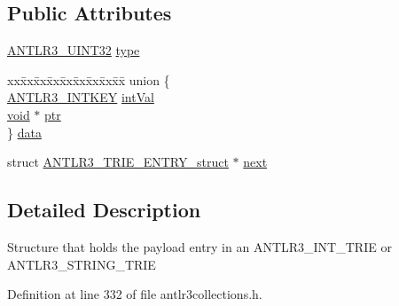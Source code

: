 \subsection*{Public Attributes}
\begin{DoxyCompactItemize}
\item 
\hyperlink{antlr3defs_8h_ac41f744abd0fd25144b9eb9d11b1dfd1}{A\-N\-T\-L\-R3\-\_\-\-U\-I\-N\-T32} \hyperlink{struct_a_n_t_l_r3___t_r_i_e___e_n_t_r_y__struct_a85222cb343509b07c9b86f742e979ffe}{type}
\item 
\begin{tabbing}
xx\=xx\=xx\=xx\=xx\=xx\=xx\=xx\=xx\=\kill
union \{\\
\>\hyperlink{antlr3defs_8h_aa5533fd558adc28dc2af0039f52324a8}{ANTLR3\_INTKEY} \hyperlink{struct_a_n_t_l_r3___t_r_i_e___e_n_t_r_y__struct_a66f9b64bbc65cbf4ae2f4b10debfd7c0}{intVal}\\
\>\hyperlink{struct_a_n_t_l_r3___t_r_i_e___e_n_t_r_y__struct_a1114cf1f9d4edc3a0783758e7ecbd989}{void} $\ast$ \hyperlink{struct_a_n_t_l_r3___t_r_i_e___e_n_t_r_y__struct_a7b80d4de117215f5580878eaddffa314}{ptr}\\
\} \hyperlink{struct_a_n_t_l_r3___t_r_i_e___e_n_t_r_y__struct_a18ef813d10c85bae2826c90019f087ad}{data}\\

\end{tabbing}\item 
struct \hyperlink{struct_a_n_t_l_r3___t_r_i_e___e_n_t_r_y__struct}{A\-N\-T\-L\-R3\-\_\-\-T\-R\-I\-E\-\_\-\-E\-N\-T\-R\-Y\-\_\-struct} $\ast$ \hyperlink{struct_a_n_t_l_r3___t_r_i_e___e_n_t_r_y__struct_a2d371b10b528dd022a8957676c7122f0}{next}
\end{DoxyCompactItemize}


\subsection{Detailed Description}
Structure that holds the payload entry in an A\-N\-T\-L\-R3\-\_\-\-I\-N\-T\-\_\-\-T\-R\-I\-E or A\-N\-T\-L\-R3\-\_\-\-S\-T\-R\-I\-N\-G\-\_\-\-T\-R\-I\-E 

Definition at line 332 of file antlr3collections.\-h.



